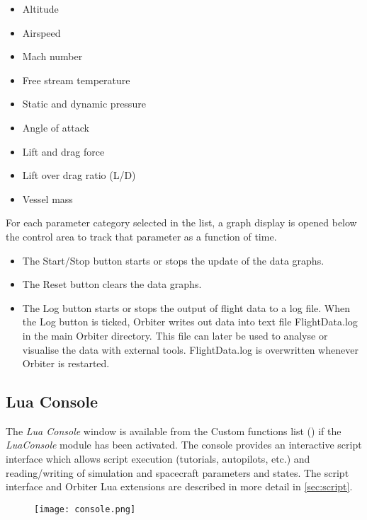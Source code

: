 \documentclass[Orbiter User Manual.tex]{subfiles}
\begin{document}
\begin{itemize}
\item Altitude
\item Airspeed
\item Mach number
\item Free stream temperature
\item Static and dynamic pressure
\item Angle of attack
\item Lift and drag force
\item Lift over drag ratio (L/D)
\item Vessel mass
\end{itemize}

\noindent
For each parameter category selected in the list, a graph display is opened below the control area to track that parameter as a function of time.

\begin{itemize}
\item The Start/Stop button starts or stops the update of the data graphs.
\item The Reset button clears the data graphs.
\item The Log button starts or stops the output of flight data to a log file. When the Log button is ticked, Orbiter writes out data into text file FlightData.log in the main Orbiter directory. This file can later be used to analyse or visualise the data with external tools. FlightData.log is overwritten whenever Orbiter is restarted.
\end{itemize}


\subsection{Lua Console}
\label{ssec:lua_console}
The \textit{Lua Console} window is available from the Custom functions list (\Ctrl{}) if the \textit{LuaConsole} module has been activated. The console provides an interactive script interface which allows script execution (tutorials, autopilots, etc.) and reading/writing of simulation and spacecraft parameters and states. The script interface and Orbiter Lua extensions are described in more detail in \ref{sec:script}.

\begin{figure}[H]
	\centering
	\texttt{[image: console.png]}
\end{figure}
\end{document}
